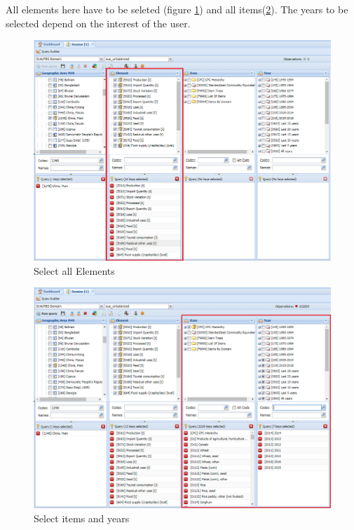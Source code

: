 \documentclass[]{article}
\begin{document}
All elements here have to be seleted (figure \ref{fig:f7}) and all
items(\ref{fig:f8}). The years to be selected depend on the interest of
the user.

\begin{figure}[H]

{\centering \includegraphics[width=1\linewidth]{images/pullData/07_selectElement} 

}

\caption{\label{fig:f7}Select all Elements}\label{fig:f7}
\end{figure}

\begin{figure}[H]

{\centering \includegraphics[width=1\linewidth]{images/pullData/08_selectItemYear} 

}

\caption{\label{fig:f8}Select items and years}\label{fig:f8}
\end{figure}
\end{document}
